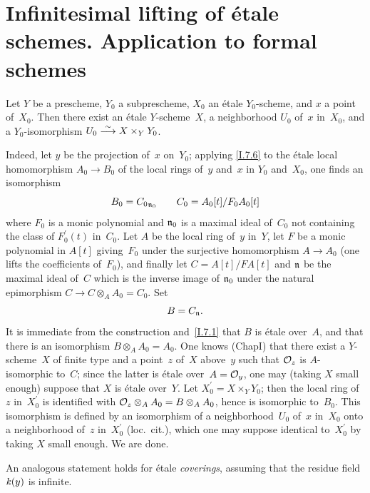 \section[Infinitesimal lifting of \'etale schemes]{Infinitesimal lifting of \'etale schemes.
Application to formal schemes}
\label{I.8}

\begin{proposition}
\label{I.8.1}
Let $Y$ be a prescheme, $Y_0$ a subprescheme, $X_0$ an \'etale
$Y_0$-scheme, and $x$ a point of~$X_0$. Then there exist an
\'etale $Y$-scheme~$X$, a neighborhood $U_0$ of~$x$ in~$X_0$,
and a $Y_0$-isomorphism $U_0\isomto X\times_Y Y_0$.
\end{proposition}

Indeed, let $y$ be the projection of~$x$ on~$Y_0$; applying
\ref{I.7.6} to the \'etale local homomorphism $A_0\to B_0$
of the local rings of~$y$ and~$x$ in $Y_0$ and~$X_0$, one
finds an isomorphism
\[
B_0 = {C_0}_{\goth{n}_0}\qquad C_0 = A_0[t]/F_0A_0[t]
\]
where $F_0$ is a monic polynomial and $\goth{n}_0$ is a
maximal ideal of~$C_0$ not containing the class of $F^\prime_0(t)$
in~$C_0$. Let $A$ be the local ring of~$y$ in~$Y$, let $F$
be a monic polynomial in $A[t]$ giving~$F_0$ under the
surjective homomorphism $A\to A_0$ (one lifts the coefficients
of~$F_0$), and finally let $C=A[t]/FA[t]$ and $\goth{n}$ be
the maximal ideal of~$C$ which is the inverse image of
$\goth{n}_0$ under the natural epimorphism
$C\to C\otimes_A A_0=C_0$. Set
\[
B = C_\goth{n}.
\]
It is immediate from the construction and~\ref{I.7.1} that
$B$ is \'etale over~$A$, and that there is an isomorphism
$B\otimes_A A_0=A_0$. One knows (Chap\ptbl I) that there
exist a $Y$-scheme~$X$ of finite type and a point~$z$ of~$X$
above~$y$ such that $\cal{O}_z$ is $A$-isomorphic to~$C$;
since the latter is \'etale over~$A=\cal{O}_y$, one may
(taking $X$ small enough) suppose that $X$ is \'etale over~$Y$.
Let $X_0^\prime=X\times_Y Y_0$; then the local ring of~$z$
in~$X_0^\prime$ is identified with
$\cal{O}_z\otimes_A A_0=B\otimes_A A_0$, hence is isomorphic
to~$B_0$. This isomorphism is defined by an isomorphism of a
neighborhood~$U_0$ of~$x$ in~$X_0$ onto a neighborhood of~$z$
in~$X_0^\prime$ (loc.\ cit.), which one may suppose identical
to~$X_0^\prime$ by taking $X$ small enough. We are done.

\begin{corollary}
\label{I.8.2}
An analogous statement holds for \'etale \emph{coverings},
assuming that the residue field $\kres(y)$ is infinite.
\end{corollary}

